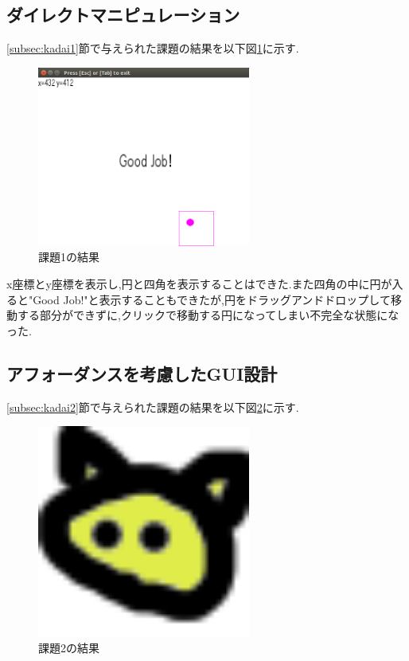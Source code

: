 \documentclass{jarticle}
\begin{document}
	\subsection{ダイレクトマニピュレーション}
	\ref{subsec:kadai1}節で与えられた課題の結果を以下図\ref{fig:kadai1}に示す.

	\begin{figure}[H]
	\begin{center}
	\includegraphics[width=7.0cm]{images/kadai1.png}
	\caption{課題1の結果}
	\label{fig:kadai1}
	\end{center}
	\end{figure}
	
	x座標とy座標を表示し,円と四角を表示することはできた.また四角の中に円が入ると"Good Job!"と表示することもできたが,円をドラッグアンドドロップして移動する部分ができずに,クリックで移動する円になってしまい不完全な状態になった.

	\subsection{アフォーダンスを考慮したGUI設計}
	\ref{subsec:kadai2}節で与えられた課題の結果を以下図\ref{fig:kadai2}に示す.

	\begin{figure}[H]
	\begin{center}
	\includegraphics[width=7.0cm]{images/kadai2.png}
	\caption{課題2の結果}
	\label{fig:kadai2}
	\end{center}
	\end{figure}
\end{document}
